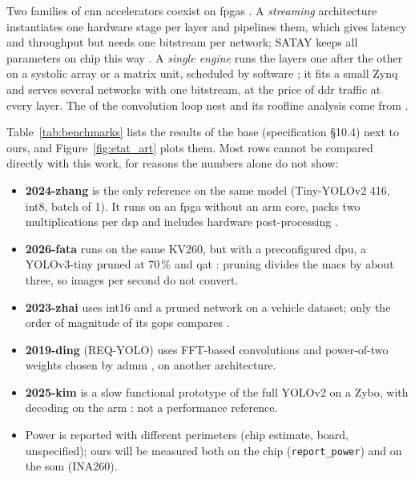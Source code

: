 \documentclass[11pt,a4paper]{article}
\begin{document}
Two families of \gls{cnn} accelerators coexist on \glspl{fpga} \cite[\#004.0]{2018-venieris}. A
\emph{streaming} architecture instantiates one hardware stage per layer and pipelines
them, which gives latency and throughput but needs one \gls{bitstream} per network; SATAY keeps
all parameters on chip this way \cite[\#006.0]{2023-montgomerie-corcoran}. A \emph{single
engine} runs the layers one after the other on a systolic array or a matrix unit,
scheduled by software \cite[\#007.1]{2018-venieris}; it fits a small Zynq and serves
several networks with one \gls{bitstream}, at the price of \gls{ddr} traffic at every layer. The
 of the convolution loop nest and its \gls{roofline} analysis come from
\citet[\#009.0, \#010.2]{2015-zhang}.

Table~\ref{tab:benchmarks} lists the results of the \gls{base} (specification §10.4) next to
ours, and Figure~\ref{fig:etat_art} plots them. Most rows cannot be compared directly with
this work, for reasons the numbers alone do not show:
\begin{itemize}
\item \textbf{2024-zhang} is the only reference on the same model (Tiny-YOLOv2 416, \gls{int8},
  batch of 1). It runs on an \gls{fpga} without an \gls{arm} core, packs two multiplications per \gls{dsp}
  \cite[\#008.0]{2024-zhang} and includes hardware post-processing
  \cite[\#013.1]{2024-zhang}.
\item \textbf{2026-fata} runs on the same KV260, but with a preconfigured \gls{dpu}, a
  YOLOv3-tiny pruned at 70\,\% and \gls{qat} \cite[\#014.4, \#015.0]{2026-fata}: pruning divides the \glspl{mac}
  by about three, so images per second do not convert.
\item \textbf{2023-zhai} uses \gls{int16} and a pruned network on a vehicle dataset; only the
  order of magnitude of its \gls{gops} compares \cite[\#002.0]{2023-zhai}.
\item \textbf{2019-ding} (REQ-YOLO) uses FFT-based convolutions and power-of-two weights
  chosen by \gls{admm} \cite[\#008.1, \#009.4]{2019-ding}, on another architecture.
\item \textbf{2025-kim} is a slow functional prototype of the full YOLOv2 on a Zybo, with
  decoding on the \gls{arm} \cite[\#026.0]{2025-kim}: not a performance reference.
\item Power is reported with different perimeters (chip estimate, board, unspecified);
  ours will be measured both on the chip (\texttt{report\_power}) and on the \gls{som} (INA260).
\end{itemize}
\end{document}

